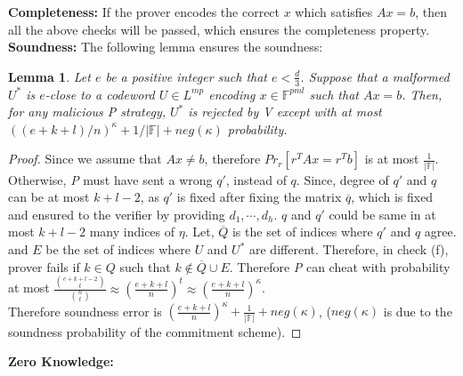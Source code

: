 \documentclass{article}
\newtheorem{lemma}[theorem]{Lemma}
\newcommand{\mycomment}[1] {\textcolor{blue}  {{\sl{#1}}}}
\begin{document}
\textbf{Completeness:} If the prover encodes the correct $x$ which satisfies $Ax=b$, then all the above checks will be passed, which ensures the completeness property.\\

\textbf{Soundness:} The following lemma ensures the soundness:

\begin{lemma}
	Let $e$ be a positive integer such that $e < \frac{d}{3}$. Suppose that a malformed $U^*$ is $e$-close to a codeword $U\in L^{mp}$ encoding $x\in \mathbb{F}^{pml}$ such that $Ax=b$. Then, for any malicious \textit{P} strategy, $U^*$ is rejected by \textit{V} except with at most $((e +k +l)/n)^{\kappa} +1/|\mathbb{F}|+neg(\kappa)$ probability.
\end{lemma}

\begin{proof}
	Since we assume that $Ax\neq b$, therefore $Pr_r[r^TAx=r^Tb]$ is at most $\frac{1}{|\mathbb{F}|}$.\\
	 Otherwise, \textit{P} must have sent a wrong $q'$, instead of $q$. Since, degree of $q'$ and $q$ can be at most $k+l-2$, as $q'$ is fixed after fixing the matrix $\overline{q}$, which is fixed and ensured to the verifier by providing $d_1,\cdots, d_h$. $q$ and $q'$ could be same in at most $k+l-2$ many indices of $\eta$. Let, $\overline{Q}$ is the set of indices where $q'$ and $q$ agree. and $E$ be the set of indices where $U$ and $U^*$ are different. Therefore, in check (f), prover fails if $k\in Q$ such that $k\notin \overline{Q}\cup E$. Therefore \textit{P} can cheat with probability at most $\frac{\binom{e+k+l-2}{t}}{\binom{n}{t}}\approx (\frac{e+k+l}{n})^t\approx (\frac{e+k+l}{n})^{\kappa}$.\\
	 Therefore soundness error is $(\frac{e+k+l}{n})^{\kappa}+\frac{1}{|\mathbb{F}|}+neg(\kappa)$, ($neg(\kappa)$ is due to the soundness probability of the commitment scheme).
\end{proof}

\textbf{Zero Knowledge:} %
\end{document}
